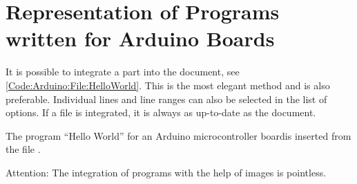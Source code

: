 %
%

\chapter{Representation of Programs written for Arduino Boards}


It is possible to integrate a part into the document, see \ref{Code:Arduino:File:HelloWorld}. This is the most elegant method and is also preferable. Individual lines and line ranges can also be selected in the list of options. If a file is integrated, it is always as up-to-date as the document.


\begin{code}
  \caption[\glqq Hello World\grqq{} in Python -- Variant 1]{The program ``Hello World'' for an Arduino microcontroller boardis inserted from the file .}\label{Code:Arduino:File:HelloWorld}    

    
\end{code}    

\bigskip

Attention: The integration of programs with the help of images is pointless.